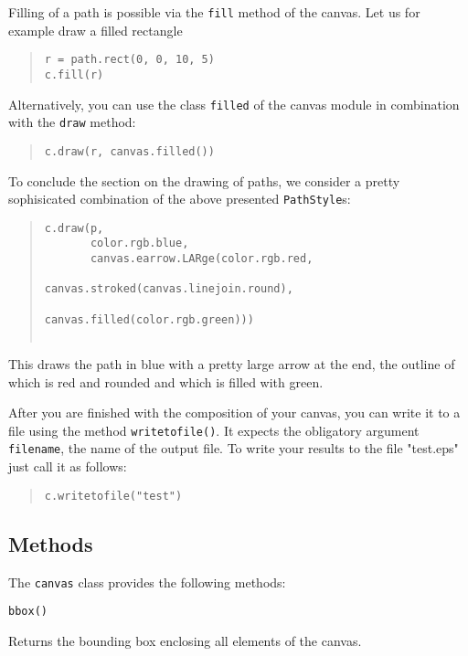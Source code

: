 Filling of a path is possible via the \verb|fill| method of the canvas.
Let us for example draw a filled rectangle 
\begin{quote}
\begin{verbatim}
r = path.rect(0, 0, 10, 5)
c.fill(r)
\end{verbatim}
\end{quote}
Alternatively, you can use the class \verb|filled| of the canvas module
in combination with the \verb|draw| method:
\begin{quote}
\begin{verbatim}
c.draw(r, canvas.filled())
\end{verbatim}
\end{quote}

To conclude the section on the drawing of paths, we consider a pretty
sophisicated combination of the above presented \verb|PathStyle|s:
\begin{quote}
\begin{verbatim}
c.draw(p, 
       color.rgb.blue, 
       canvas.earrow.LARge(color.rgb.red,
                           canvas.stroked(canvas.linejoin.round),
	                                  canvas.filled(color.rgb.green)))
							      
\end{verbatim}
\end{quote}
This draws the path in blue with a pretty large arrow at the end, the outline
of which is red and rounded and which is filled with green.

After you are finished with the composition of your canvas, you can
write it to a file using the method \verb|writetofile()|. It expects the
obligatory argument \verb|filename|, the name of the output
file. To write your results to the file "test.eps" just call it as follows:
\begin{quote}
\begin{verbatim}
c.writetofile("test")
\end{verbatim}
\end{quote}


\subsection{Methods}



The \verb|canvas| class provides the following methods:


\verb|bbox()| 

Returns the bounding box enclosing all elements of the canvas.

